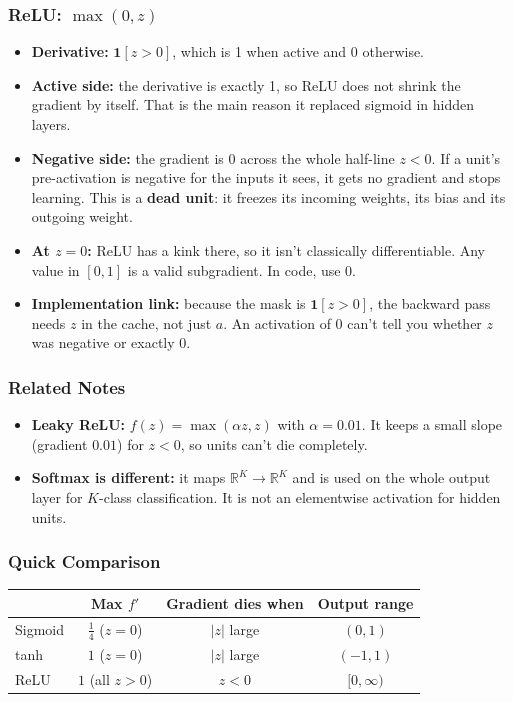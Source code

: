 \subsubsection*{ReLU: $\max(0, z)$}
\begin{itemize}
  \item \textbf{Derivative:} $\mathbf{1}[z > 0]$, which is 1 when active and 0 otherwise.
  \item \textbf{Active side:} the derivative is exactly 1, so ReLU does not shrink the gradient by itself. That is the main reason it replaced sigmoid in hidden layers.
  \item \textbf{Negative side:} the gradient is 0 across the whole half-line $z < 0$. If a unit's pre-activation is negative for the inputs it sees, it gets no gradient and stops learning. This is a \textbf{dead unit}: it freezes its incoming weights, its bias and its outgoing weight.
  \item \textbf{At $z=0$:} ReLU has a kink there, so it isn't classically differentiable. Any value in $[0,1]$ is a valid subgradient. In code, use 0.
  \item \textbf{Implementation link:} because the mask is $\mathbf{1}[z>0]$, the backward pass needs $z$ in the cache, not just $a$. An activation of 0 can't tell you whether $z$ was negative or exactly 0.
\end{itemize}

\subsubsection*{Related Notes}
\begin{itemize}
  \item \textbf{Leaky ReLU:} $f(z) = \max(\alpha z, z)$ with $\alpha = 0.01$. It keeps a small slope (gradient $0.01$) for $z<0$, so units can't die completely.
  \item \textbf{Softmax is different:} it maps $\mathbb{R}^K \to \mathbb{R}^K$ and is used on the whole output layer for $K$-class classification. It is not an elementwise activation for hidden units.
\end{itemize}

\subsubsection*{Quick Comparison}
\begin{center}
\begin{tabular}{lccc}
\toprule
 & Max $f'$ & Gradient dies when & Output range \\
\midrule
Sigmoid & $\frac{1}{4}$ ($z=0$) & $|z|$ large & $(0,1)$ \\
tanh & $1$ ($z=0$) & $|z|$ large & $(-1,1)$ \\
ReLU & $1$ (all $z>0$) & $z<0$ & $[0,\infty)$ \\
\bottomrule
\end{tabular}
\end{center}

